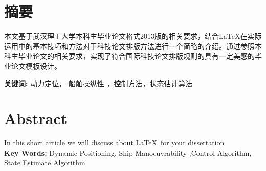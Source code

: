 \section*{ \centering 摘要}

\vskip0.5cm
本文基于武汉理工大学本科生毕业论文格式2013版的相关要求，结合\LaTeX 在实际运用中的基本技巧和方法对于科技论文排版方法进行一个简略的介绍。通过参照本科生毕业论文的相关要求，实现了符合国际科技论文排版规则的具有一定美感的毕业论文模板设计。 


\textbf{关键词:}  动力定位， 船舶操纵性 ，控制方法，状态估计算法

\clearpage
\section*{ \centering \textbf{Abstract} }

In this short article we will discuss about \LaTeX\,  for your dissertation \\

\textbf{Key Words:} Dynamic Positioning, Ship Manoeuvrability ,Control Algorithm, State Estimate Algorithm




